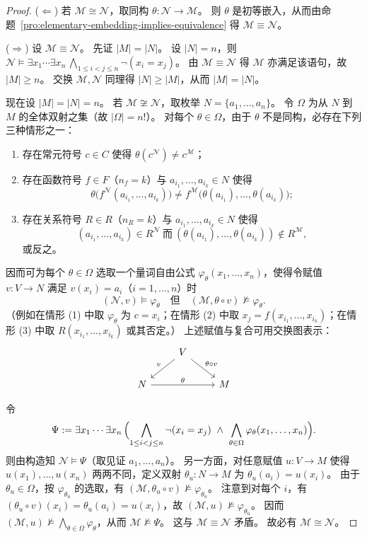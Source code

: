 \documentclass[lang=cn,a4paper,newtx,section]{elegantbook}
\begin{document}
 \begin{proof}
 ($\Leftarrow$) 若 $\mathcal M\cong\mathcal N$，取同构 $\theta:\mathcal N\to\mathcal M$。
 则 $\theta$ 是初等嵌入，从而由命题~\ref{pro:elementary-embedding-implies-equivalence} 得 $\mathcal M\equiv\mathcal N$。

 ($\Rightarrow$) 设 $\mathcal M\equiv\mathcal N$。
 先证 $|M|=|N|$。
 设 $|N|=n$，则 $\mathcal N\models\exists x_1\cdots\exists x_n\,\bigwedge_{1\le i<j\le n}\neg(x_i=x_j)$。
 由 $\mathcal M\equiv\mathcal N$ 得 $\mathcal M$ 亦满足该语句，故 $|M|\ge n$。
 交换 $\mathcal M,\mathcal N$ 同理得 $|N|\ge|M|$，从而 $|M|=|N|$。
 
 现在设 $|M|=|N|=n$。
 若 $\mathcal M\not\cong\mathcal N$，取枚举 $N=\{a_1,\dots,a_n\}$。
 令 $\Omega$ 为从 $N$ 到 $M$ 的全体双射之集（故 $|\Omega|=n!$）。
 对每个 $\theta\in\Omega$，由于 $\theta$ 不是同构，必存在下列三种情形之一：
 \begin{enumerate}
   \item 存在常元符号 $c\in C$ 使得 $\theta(c^{\mathcal N})\neq c^{\mathcal M}$；
   \item 存在函数符号 $f\in F$（$n_f=k$）与 $a_{i_1},\dots,a_{i_k}\in N$ 使得
   \[
     \theta\bigl(f^{\mathcal N}(a_{i_1},\dots,a_{i_k})\bigr)\neq f^{\mathcal M}\bigl(\theta(a_{i_1}),\dots,\theta(a_{i_k})\bigr);
   \]
   \item 存在关系符号 $R\in R$（$n_R=k$）与 $a_{i_1},\dots,a_{i_k}\in N$ 使得
   \[
     (a_{i_1},\dots,a_{i_k})\in R^{\mathcal N}\ \text{而}\ (\theta(a_{i_1}),\dots,\theta(a_{i_k}))\notin R^{\mathcal M},
   \]
   或反之。
 \end{enumerate}
 因而可为每个 $\theta\in\Omega$ 选取一个量词自由公式 $\varphi_{\theta}(x_1,\dots,x_n)$，使得令赋值 $v:V\to N$ 满足 $v(x_i)=a_i$（$i=1,\dots,n$）时
 \[
   (\mathcal N,v)\models\varphi_{\theta}\quad\text{但}\quad (\mathcal M,\theta\circ v)\not\models\varphi_{\theta}.
 \]
 （例如在情形 (1) 中取 $\varphi_{\theta}$ 为 $c=x_i$；在情形 (2) 中取 $x_j=f(x_{i_1},\dots,x_{i_k})$；在情形 (3) 中取 $R(x_{i_1},\dots,x_{i_k})$ 或其否定。）
 上述赋值与复合可用交换图表示：
 \[
 \begin{tikzcd}
 & V \arrow[dl, "v"'] \arrow[dr, "\theta\circ v"] & \\
 N \arrow[rr, "\theta"] & & M
 \end{tikzcd}
 \]

 令
 \[
   \Psi:=\exists x_1\cdots\exists x_n\,\Bigl(\bigwedge_{1\le i<j\le n}\neg(x_i=x_j)\ \wedge\ \bigwedge_{\theta\in\Omega}\varphi_{\theta}(x_1,\dots,x_n)\Bigr).
 \]
 则由构造知 $\mathcal N\models\Psi$（取见证 $a_1,\dots,a_n$）。
 另一方面，对任意赋值 $u:V\to M$ 使得 $u(x_1),\dots,u(x_n)$ 两两不同，定义双射 $\theta_u:N\to M$ 为 $\theta_u(a_i)=u(x_i)$。
 由于 $\theta_u\in\Omega$，按 $\varphi_{\theta_u}$ 的选取，有 $(\mathcal M,\theta_u\circ v)\not\models\varphi_{\theta_u}$。
 注意到对每个 $i$，有 $(\theta_u\circ v)(x_i)=\theta_u(a_i)=u(x_i)$，故 $(\mathcal M,u)\not\models\varphi_{\theta_u}$。
 因而 $(\mathcal M,u)\not\models\bigwedge_{\theta\in\Omega}\varphi_{\theta}$，从而 $\mathcal M\not\models\Psi$。
 这与 $\mathcal M\equiv\mathcal N$ 矛盾。
 故必有 $\mathcal M\cong\mathcal N$。
 \end{proof}
\end{document}
